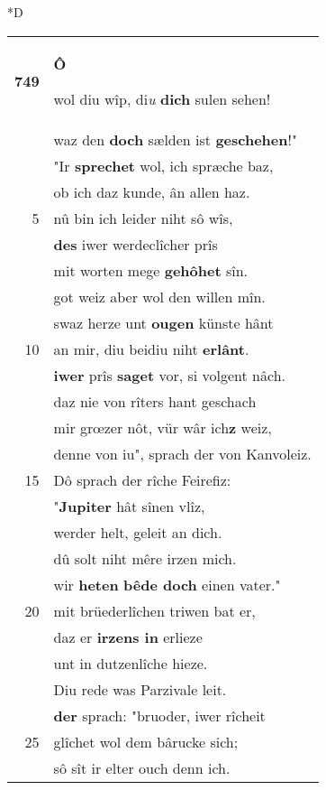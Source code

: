 \documentclass[8pt,a4paper,notitlepage]{article}
\begin{document}
\begin{table}[ht]
\begin{minipage}[t]{0.5\linewidth}
\small
\begin{center}*D
\end{center}
\begin{tabular}{rl}
\textbf{749} & \begin{large}\textbf{Ô}\end{large} wol diu wîp, di\textit{u} \textbf{dich} sulen sehen!\\ 
 & waz den \textbf{doch} sælden ist \textbf{geschehen}!"\\ 
 & "Ir \textbf{sprechet} wol, ich spræche baz,\\ 
 & ob ich daz kunde, ân allen haz.\\ 
5 & nû bin ich leider niht sô wîs,\\ 
 & \textbf{des} iwer werdeclîcher prîs\\ 
 & mit worten mege \textbf{gehôhet} sîn.\\ 
 & got weiz aber wol den willen mîn.\\ 
 & swaz herze unt \textbf{ougen} künste hânt\\ 
10 & an mir, diu beidiu niht \textbf{erlânt}.\\ 
 & \textbf{iwer} prîs \textbf{saget} vor, si volgent nâch.\\ 
 & daz nie von rîters hant geschach\\ 
 & mir grœzer nôt, vür wâr ich\textbf{z} weiz,\\ 
 & denne von iu", sprach der von Kanvoleiz.\\ 
15 & Dô sprach der rîche Feirefiz:\\ 
 & "\textbf{Jupiter} hât sînen vlîz,\\ 
 & werder helt, geleit an dich.\\ 
 & dû solt niht mêre irzen mich.\\ 
 & wir \textbf{heten} \textbf{bêde doch} einen vater."\\ 
20 & mit brüederlîchen triwen bat er,\\ 
 & daz er \textbf{irzens in} erlieze\\ 
 & unt in dutzenlîche hieze.\\ 
 & Diu rede was Parzivale leit.\\ 
 & \textbf{der} sprach: "bruoder, iwer rîcheit\\ 
25 & glîchet wol dem bârucke sich;\\ 
 & sô sît ir elter ouch denn ich.\\ 

\end{tabular}
\end{minipage}
\end{table}
\end{document}
